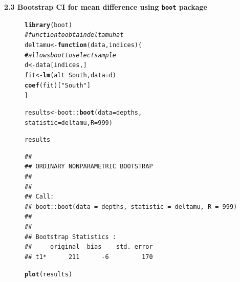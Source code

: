 \documentclass[10pt]{beamer}\usepackage[]{graphicx}\usepackage[]{color}
\makeatletter
\newcommand{\hlnum}[1]{\textcolor[rgb]{0.686,0.059,0.569}{#1}}%
\newcommand{\hlstr}[1]{\textcolor[rgb]{0.192,0.494,0.8}{#1}}%
\newcommand{\hlcom}[1]{\textcolor[rgb]{0.678,0.584,0.686}{\textit{#1}}}%
\newcommand{\hlopt}[1]{\textcolor[rgb]{0,0,0}{#1}}%
\newcommand{\hlstd}[1]{\textcolor[rgb]{0.345,0.345,0.345}{#1}}%
\newcommand{\hlkwa}[1]{\textcolor[rgb]{0.161,0.373,0.58}{\textbf{#1}}}%
\newcommand{\hlkwb}[1]{\textcolor[rgb]{0.69,0.353,0.396}{#1}}%
\newcommand{\hlkwc}[1]{\textcolor[rgb]{0.333,0.667,0.333}{#1}}%
\newcommand{\hlkwd}[1]{\textcolor[rgb]{0.737,0.353,0.396}{\textbf{#1}}}%
\newenvironment{kframe}{%
 \def\at@end@of@kframe{}%
 \ifinner\ifhmode%
  \def\at@end@of@kframe{\end{minipage}}%
  \begin{minipage}{\columnwidth}%
 \fi\fi%
 \def\FrameCommand##1{\hskip\@totalleftmargin \hskip-\fboxsep
 \colorbox{shadecolor}{##1}\hskip-\fboxsep
     \hskip-\linewidth \hskip-\@totalleftmargin \hskip\columnwidth}%
 \MakeFramed {\advance\hsize-\width
   \@totalleftmargin\z@ \linewidth\hsize
   \@setminipage}}%
 {\par\unskip\endMakeFramed%
 \at@end@of@kframe}
\newenvironment{knitrout}{}{} %
\makeatother
\begin{document}
\begin{frame}
	\textbf{2.3 Bootstrap CI for mean difference using \texttt{boot} package}
	\begin{figure}
		\begin{minipage}[h]{0.40\linewidth}
\begin{knitrout}\tiny
{}\color{fgcolor}\begin{kframe}
\begin{alltt}
\hlkwd{library}\hlstd{(boot)}
\hlcom{# function to obtain deltamu hat}
\hlstd{deltamu} \hlkwb{<-} \hlkwa{function}\hlstd{(}\hlkwc{data}\hlstd{,} \hlkwc{indices}\hlstd{) \{}
\hlcom{# allows boot to select sample}
\hlstd{d} \hlkwb{<-} \hlstd{data[indices,]}
\hlstd{fit} \hlkwb{<-} \hlkwd{lm}\hlstd{(alt} \hlopt{~} \hlstd{South,} \hlkwc{data}\hlstd{=d)}
\hlkwd{coef}\hlstd{(fit)[}\hlstr{"South"}\hlstd{]}
\hlstd{\}}

\hlstd{results} \hlkwb{<-} \hlstd{boot}\hlopt{::}\hlkwd{boot}\hlstd{(}\hlkwc{data} \hlstd{= depths,}
\hlkwc{statistic} \hlstd{= deltamu,} \hlkwc{R}\hlstd{=}\hlnum{999}\hlstd{)}

\hlstd{results}
\end{alltt}
\begin{verbatim}
## 
## ORDINARY NONPARAMETRIC BOOTSTRAP
## 
## 
## Call:
## boot::boot(data = depths, statistic = deltamu, R = 999)
## 
## 
## Bootstrap Statistics :
##     original  bias    std. error
## t1*      211      -6         170
\end{verbatim}
\end{kframe}
\end{knitrout}
			
		\end{minipage}
		\hspace{0.4cm}
		\begin{minipage}[h]{0.50\linewidth}
\begin{knitrout}\tiny
{}\color{fgcolor}\begin{kframe}
\begin{alltt}
\hlkwd{plot}\hlstd{(results)}
\end{alltt}
\end{kframe}


\end{knitrout}
\end{minipage}
\end{figure}
\end{frame}
\end{document}
